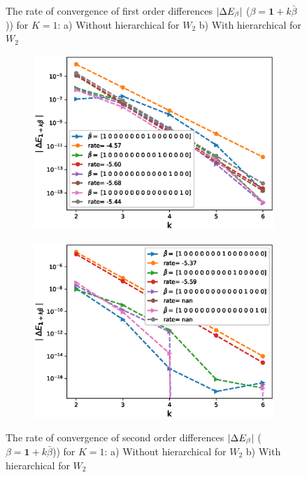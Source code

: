 \documentclass[11pt]{article}
\begin{document}
\begin{figure}[h!]
	\caption{The rate of convergence of  first order differences $\left\lvert\Delta E_{\beta}\right\rvert$ ($\beta=\mathbf{1}+k \bar{\beta}$)) for $K=1$: a) Without hierarchical for $W_2$ b) With hierarchical for $W_2$}
	\label{fig:first_diff_tot_hiera_W2}
\end{figure}

\begin{figure}[h!]
	\centering
	\begin{subfigure}{.5\textwidth}
		\centering
		\includegraphics[width=1\linewidth]{./figures/effect_H_differences/hierarchical/H_007/N_8/mixed_difference_order2_rbergomi_8steps_H_007_K_1_hierarch_with_rate_W2}
		\caption{}
		\label{fig:sub3}
	\end{subfigure}%
	\begin{subfigure}{.5\textwidth}
		\centering
		\includegraphics[width=1\linewidth]{./figures/effect_H_differences/total_hierarchical/mixed_difference_order2_rbergomi_8steps_H_007_K_1_totally_hierarch_with_rate_W2}
		\caption{}
		\label{fig:sub4}
	\end{subfigure}
	
	\caption{The rate of convergence of  second order differences $\left\lvert\Delta E_{\beta}\right\rvert$ ($\beta=\mathbf{1}+k \bar{\beta}$)) for $K=1$: a) Without hierarchical for $W_2$ b) With hierarchical for $W_2$}
	\label{fig:second_diff_tot_hiera_W2}
\end{figure}
\end{document}
